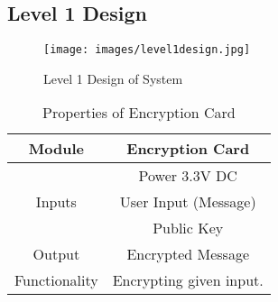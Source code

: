 \documentclass[12pt]{article}
\begin{document}
	\subsection{Level 1 Design}
	\begin{figure}[h]
		\centering
		\label{Level 1 Design of System }
		\texttt{[image: images/level1design.jpg]}\\[0.5 cm]	
		\caption{Level 1 Design of System } 		
	\end{figure}
\begin{table}[h]
	\centering
	
	\label{Properties of Encryption Card}
	\begin{tabular}{|c|c|}
		\hline
		Module & Encryption Card \\ \hline
		\multirow{3}{*}{Inputs} & Power 3.3V DC \\
		\cline{2-2}
		& User Input (Message) \\
		\cline{2-2}
		& Public Key \\ \hline
		Output & Encrypted Message \\ \hline
		Functionality & Encrypting given input.\\ \hline		
	\end{tabular}
	\caption{Properties of Encryption Card}
\end{table}
\end{document}
